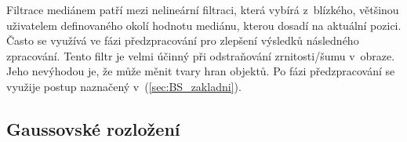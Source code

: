 \par{Filtrace mediánem patří mezi nelineární filtraci, která vybírá z~blízkého, většinou u\-ži\-va\-te\-lem definovaného okolí hodnotu mediánu, kterou dosadí na aktuální pozici. Často se využívá ve fázi předzpracování pro zlepšení výsledků následného zpracování. Tento filtr je velmi účinný při odstraňování zrnitosti/šumu v~obraze. Jeho nevýhodou je, že může měnit tvary hran objektů. Po fázi předzpracování se využije postup naznačený v~(\ref{sec:BS_zakladni}).}






\newpage







\subsection{Gaussovské rozložení}
\label{sec:BS_teorie_gaussovske_rozlozeni}

